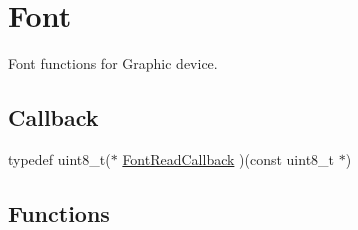 \hypertarget{group__graphic__device__font}{
\section{Font}
\label{group__graphic__device__font}
}
Font functions for Graphic device.  


\subsection*{Callback}
\begin{CompactItemize}
\item 
typedef uint8\_\-t($\ast$ \hyperlink{group__graphic__device__font_ge7d259c434193cdc93d4d4136d77612a}{FontReadCallback} )(const uint8\_\-t $\ast$)
\end{CompactItemize}
\subsection*{Functions}
